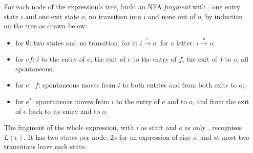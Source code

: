 \begin{method}\label{met:b2:regular-languages:thompson}
For each node of the expression's tree, build an NFA \emph{fragment} with , one entry state $i$
and one exit state $o$, no transition into $i$ and none out of $o$, by induction on the tree
as drawn below:
\begin{itemize}
\item for $\emptyset$: two states and no transition; for $\varepsilon$: $i \xrightarrow{\varepsilon} o$; for a letter:
$i \xrightarrow{a} o$;
\item for $ef$: $i$ to the entry of $e$, the exit of $e$ to the entry of $f$, the exit of $f$ to $o$, all spontaneous;
\item for $e \mid f$: spontaneous moves from $i$ to both entries and from both exits to $o$;
\item for $e^*$: spontaneous moves from $i$ to the entry of $e$ and to $o$, and from the exit of $e$ back to its entry
and to $o$.
\end{itemize}
The fragment of the whole expression, with $i$ as start and $o$ as only , recognises $L(e)$. It has two
states per node, $2s$ for an expression of size $s$, and at most two transitions leave each state.
\end{method}


